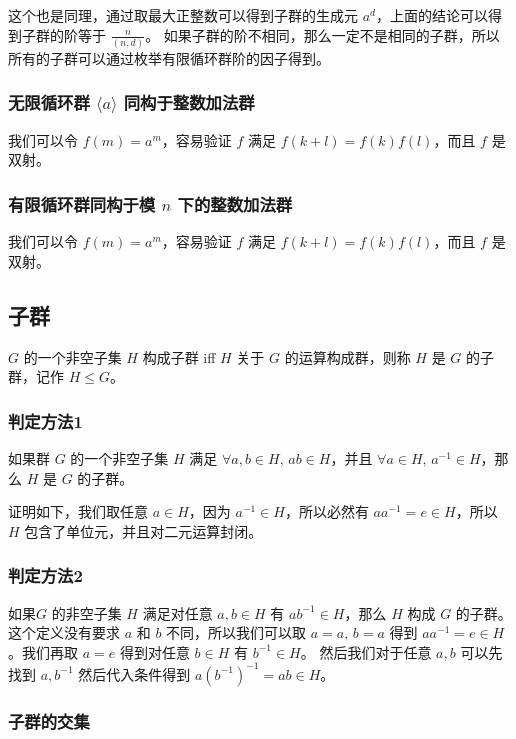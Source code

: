 这个也是同理，通过取最大正整数可以得到子群的生成元 $a^d$，上面的结论可以得到子群的阶等于 $\frac{n}{(n,d)}$。
如果子群的阶不相同，那么一定不是相同的子群，所以所有的子群可以通过枚举有限循环群阶的因子得到。

\subsubsection{无限循环群 $\langle a \rangle$ 同构于整数加法群}

我们可以令 $f(m) = a^m$，容易验证 $f$ 满足 $f(k + l) = f(k)f(l)$，而且 $f$ 是双射。

\subsubsection{有限循环群同构于模 $n$ 下的整数加法群}

我们可以令 $f(m) = a^m$，容易验证 $f$ 满足 $f(k+l) = f(k)f(l)$，而且 $f$ 是双射。

\subsection{子群}

$G$ 的一个非空子集 $H$ 构成子群 iff $H$ 关于 $G$ 的运算构成群，则称 $H$ 是 $G$ 的子群，记作 $H \leq G$。

\subsubsection{判定方法1}

如果群 $G$ 的一个非空子集 $H$ 满足 $\forall a,b \in H,\, ab \in H$，并且 $\forall a \in H,\, a^{-1} \in H$，那么 $H$ 是 $G$ 的子群。

证明如下，我们取任意 $a \in H$，因为 $a^{-1} \in H$，所以必然有 $ aa^{-1} = e \in H$，所以 $H$ 包含了单位元，并且对二元运算封闭。

\subsubsection{判定方法2}

如果$G$ 的非空子集 $H$ 满足对任意 $a,b \in H$ 有 $ab^{-1} \in H$，那么 $H$ 构成 $G$ 的子群。
这个定义没有要求 $a$ 和 $b$ 不同，所以我们可以取 $a = a,\, b = a$ 得到 $aa^{-1} = e \in H$。我们再取 $a = e$ 得到对任意 $b \in H$ 有 $b^{-1} \in H$。
然后我们对于任意 $a,b$ 可以先找到 $a, b^{-1}$ 然后代入条件得到 $a(b^{-1})^{-1} = ab \in H$。

\subsubsection{子群的交集}

